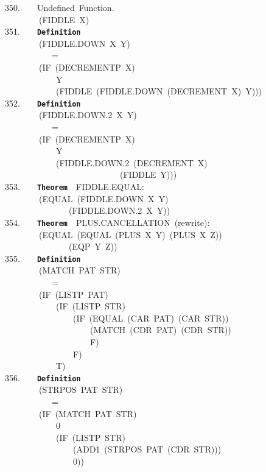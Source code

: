 \documentclass[11pt]{book}
\newenvironment{pubasis}{\begin{flushleft}\ttfamily\small}{\normalsize\rmfamily\end{flushleft}}
\newcommand{\axiomordefinition}[1]{\vspace{6pt}\texttt{\textbf{#1}}}
\begin{document}
\begin{pubasis}
350.~~~~Undefined~Function.\\
~~~~~~~~(FIDDLE~X)\\

351.~~~~\axiomordefinition{Definition}\\
~~~~~~~~(FIDDLE.DOWN~X~Y)\\
~~~~~~~~~~~=\\
~~~~~~~~(IF~(DECREMENTP~X)\\
~~~~~~~~~~~~Y\\
~~~~~~~~~~~~(FIDDLE~(FIDDLE.DOWN~(DECREMENT~X)~Y)))\\

352.~~~~\axiomordefinition{Definition}\\
~~~~~~~~(FIDDLE.DOWN.2~X~Y)\\
~~~~~~~~~~~=\\
~~~~~~~~(IF~(DECREMENTP~X)\\
~~~~~~~~~~~~Y\\
~~~~~~~~~~~~(FIDDLE.DOWN.2~(DECREMENT~X)\\
~~~~~~~~~~~~~~~~~~~~~~~~~~~(FIDDLE~Y)))\\

353.~~~~\axiomordefinition{Theorem}~~FIDDLE.EQUAL:\\
~~~~~~~~(EQUAL~(FIDDLE.DOWN~X~Y)\\
~~~~~~~~~~~~~~~(FIDDLE.DOWN.2~X~Y))\\

354.~~~~\axiomordefinition{Theorem}~~PLUS.CAN\-CELLATION~(rewrite):\\
~~~~~~~~(EQUAL~(EQUAL~(PLUS~X~Y)~(PLUS~X~Z))\\
~~~~~~~~~~~~~~~(EQP~Y~Z))\\

355.~~~~\axiomordefinition{Definition}\\
~~~~~~~~(MATCH~PAT~STR)\\
~~~~~~~~~~~=\\
~~~~~~~~(IF~(LISTP~PAT)\\
~~~~~~~~~~~~(IF~(LISTP~STR)\\
~~~~~~~~~~~~~~~~(IF~(EQUAL~(CAR~PAT)~(CAR~STR))\\
~~~~~~~~~~~~~~~~~~~~(MATCH~(CDR~PAT)~(CDR~STR))\\
~~~~~~~~~~~~~~~~~~~~F)\\
~~~~~~~~~~~~~~~~F)\\
~~~~~~~~~~~~T)\\

356.~~~~\axiomordefinition{Definition}\\
~~~~~~~~(STRPOS~PAT~STR)\\
~~~~~~~~~~~=\\
~~~~~~~~(IF~(MATCH~PAT~STR)\\
~~~~~~~~~~~~0\\
~~~~~~~~~~~~(IF~(LISTP~STR)\\
~~~~~~~~~~~~~~~~(ADD1~(STRPOS~PAT~(CDR~STR)))\\
~~~~~~~~~~~~~~~~0))\\


\end{pubasis}
\end{document}
